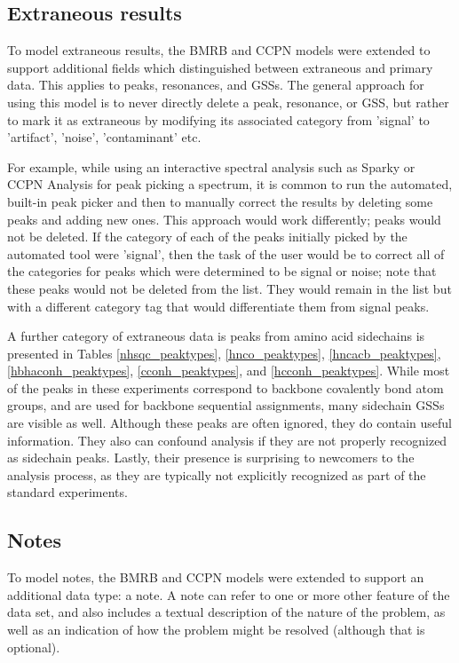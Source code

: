 \subsection{Extraneous results}
To model extraneous results, the BMRB and CCPN models \cite{bmrb, ccpn}
were extended to support additional fields which distinguished between 
extraneous and primary data.
This applies to peaks, resonances, and GSSs.
The general approach for using this model is to never directly delete
a peak, resonance, or GSS, but rather to mark it as extraneous by modifying
its associated category from 'signal' to 'artifact', 'noise', 'contaminant'
etc.

For example, while using an interactive spectral analysis such as Sparky or
CCPN Analysis \cite{sparky, ccpn} for peak picking a spectrum, it is common
to run the automated, built-in peak picker and then to manually correct the
results by deleting some peaks and adding new ones.  This approach would
work differently; peaks would not be deleted.  If the category of each of the
peaks initially picked by the automated tool were 'signal', then the task of
the user would be to correct all of the categories for peaks which were 
determined to be signal or noise; note that these peaks would not be deleted
from the list.  They would remain in the list but with a different category
tag that would differentiate them from signal peaks.

A further category of extraneous data is peaks from amino acid sidechains 
is presented in Tables \ref{nhsqc_peaktypes}, \ref{hnco_peaktypes}, 
\ref{hncacb_peaktypes}, \ref{hbhaconh_peaktypes}, \ref{cconh_peaktypes}, and
\ref{hcconh_peaktypes}.  While most of the
peaks in these experiments correspond to backbone covalently bond atom groups, 
and are used for backbone sequential assignments, many sidechain GSSs are
visible as well.  Although these peaks are often ignored, they do contain
useful information.  They also can confound analysis if they are not properly
recognized as sidechain peaks.  Lastly, their presence is surprising to 
newcomers to the analysis process, as they are typically not explicitly 
recognized as part of the standard experiments.


\subsection{Notes}
To model notes, the BMRB and CCPN models \cite{bmrb, ccpn} were extended
to support an additional data type: a note.  A note can refer to one or more
other feature of the data set, and also includes a textual description of
the nature of the problem, as well as an indication of how the problem might
be resolved (although that is optional).

